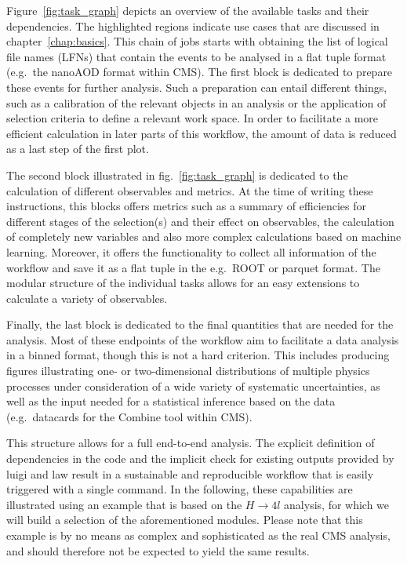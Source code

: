 Figure~\ref{fig:task_graph} depicts an overview of the available tasks and their dependencies.
The highlighted regions indicate use cases that are discussed in chapter~\ref{chap:basics}.
This chain of jobs starts with obtaining the list of logical file names (LFNs) that contain the events to be analysed in a flat tuple format (e.g.\ the nanoAOD format within CMS).
The first block is dedicated to prepare these events for further analysis.
Such a preparation can entail different things, such as a calibration of the relevant objects in an analysis or the application of selection criteria to define a relevant work space.
In order to facilitate a more efficient calculation in later parts of this workflow, the amount of data is reduced as a last step of the first plot.

The second block illustrated in fig.~\ref{fig:task_graph} is dedicated to the calculation of different observables and metrics.
At the time of writing these instructions, this blocks offers metrics such as a summary of efficiencies for different stages of the selection(s) and their effect on observables, the calculation of completely new variables and also more complex calculations based on machine learning.
Moreover, it offers the functionality to collect all information of the workflow and save it as a flat tuple in the e.g.\ ROOT or parquet format.
The modular structure of the individual tasks allows for an easy extensions to calculate a variety of observables.

Finally, the last block is dedicated to the final quantities that are needed for the analysis.
Most of these endpoints of the workflow aim to facilitate a data analysis in a binned format, though this is not a hard criterion.
This includes producing figures illustrating one- or two-dimensional distributions of multiple physics processes under consideration of a wide variety of systematic uncertainties, as well as the input needed for a statistical inference based on the data (e.g.\ datacards for the Combine tool within CMS).

This structure allows for a full end-to-end analysis.
The explicit definition of dependencies in the code and the implicit check for existing outputs provided by luigi and law result in a sustainable and reproducible workflow that is easily triggered with a single command.
In the following, these capabilities are illustrated using an example that is based on the $H\rightarrow4l$ analysis, for which we will build a selection of the aforementioned modules.
Please note that this example is by no means as complex and sophisticated as the real CMS analysis, and should therefore not be expected to yield the same results.